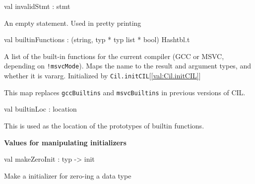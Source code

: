 \documentclass[11pt]{article}
\begin{document}
\label{val:Cil.invalidStmt}\begin{ocamldoccode}
val invalidStmt : stmt
\end{ocamldoccode}
\begin{ocamldocdescription}
An empty statement. Used in pretty printing


\end{ocamldocdescription}




\label{val:Cil.builtinFunctions}\begin{ocamldoccode}
val builtinFunctions : (string, typ * typ list * bool) Hashtbl.t
\end{ocamldoccode}
\begin{ocamldocdescription}
A list of the built-in functions for the current compiler (GCC or
 MSVC, depending on {\tt{!msvcMode}}).  Maps the name to the
 result and argument types, and whether it is vararg.
 Initialized by {\tt{Cil.initCIL}}[\ref{val:Cil.initCIL}]


 This map replaces {\tt{gccBuiltins}} and {\tt{msvcBuiltins}} in previous
 versions of CIL.


\end{ocamldocdescription}




\label{val:Cil.builtinLoc}\begin{ocamldoccode}
val builtinLoc : location
\end{ocamldoccode}
\begin{ocamldocdescription}
This is used as the location of the prototypes of builtin functions.


\end{ocamldocdescription}




{\bf Values for manipulating initializers}



\label{val:Cil.makeZeroInit}\begin{ocamldoccode}
val makeZeroInit : typ -> init
\end{ocamldoccode}
\begin{ocamldocdescription}
Make a initializer for zero-ing a data type


\end{ocamldocdescription}
\end{document}
